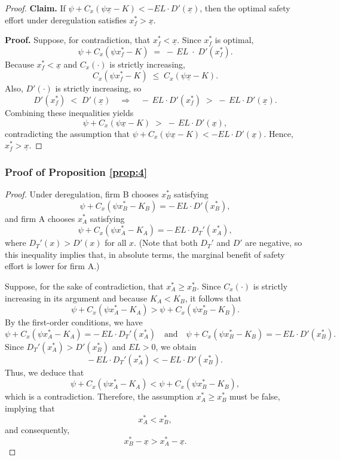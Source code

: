 \documentclass[letterpaper,12pt]{article}
\theoremstyle{definition}
\begin{document}
\begin{proof}
\textbf{Claim.} If \(\psi + C_x(\psi \underline{x} - K) < -EL \cdot D'(\underline{x})\), then the optimal safety effort under deregulation satisfies \(x_f^* > \underline{x}\).

\noindent\textbf{Proof.}
Suppose, for contradiction, that \(x_f^* < \underline{x}\). Since \(x_f^*\) is optimal,
\begin{equation}
    \psi + C_x(\psi x_f^* - K) \;=\; -\, EL \;\cdot\; D'(x_f^*).
\end{equation}
Because \(x_f^* < \underline{x}\) and \(C_x(\cdot)\) is strictly increasing, 
\[
    C_x(\psi x_f^* - K) \;\le\; C_x(\psi \underline{x} - K).
\]
Also, \(D'(\cdot)\) is strictly increasing, so
\[
    D'(x_f^*) \;<\; D'(\underline{x})
    \quad\Longrightarrow\quad
    -\,EL \cdot D'(x_f^*) \;>\; -\,EL \cdot D'(\underline{x}).
\]
Combining these inequalities yields
\begin{equation}
    \psi + C_x(\psi \underline{x} - K)
    \;>\;
    -\,EL \cdot D'(\underline{x}),
\end{equation}
contradicting the assumption that \(\psi + C_x(\psi \underline{x} - K) < -EL \cdot D'(\underline{x})\). Hence, \(x_f^* > \underline{x}\).
\end{proof}

\subsubsection*{Proof of Proposition \ref{prop:4}}

\begin{proof}
Under deregulation, firm B chooses \(x_B^*\) satisfying
\[
\psi + C_x(\psi x_B^* - K_B) = -\,EL \cdot D'(x_B^*),
\]
and firm A chooses \(x_A^*\) satisfying
\[
\psi + C_x(\psi x_A^* - K_A) = -\,EL \cdot D_T'(x_A^*),
\]
where \(D_T'(x) > D'(x)\) for all \(x\). (Note that both \(D_T'\) and \(D'\) are negative, so this inequality implies that, in absolute terms, the marginal benefit of safety effort is lower for firm A.)

Suppose, for the sake of contradiction, that \(x_A^* \ge x_B^*\). Since \(C_x(\cdot)\) is strictly increasing in its argument and because \(K_A < K_B\), it follows that
\[
\psi + C_x(\psi x_A^* - K_A) > \psi + C_x(\psi x_B^* - K_B).
\]
By the first-order conditions, we have
\[
\psi + C_x(\psi x_A^* - K_A) = -\,EL \cdot D_T'(x_A^*) \quad \text{and} \quad \psi + C_x(\psi x_B^* - K_B) = -\,EL \cdot D'(x_B^*).
\]
Since \(D_T'(x_A^*) > D'(x_B^*)\) and \(EL > 0\), we obtain
\[
-\,EL \cdot D_T'(x_A^*) < -\,EL \cdot D'(x_B^*).
\]
Thus, we deduce that
\[
\psi + C_x(\psi x_A^* - K_A) < \psi + C_x(\psi x_B^* - K_B),
\]
which is a contradiction. Therefore, the assumption \(x_A^* \ge x_B^*\) must be false, implying that
\[
x_A^* < x_B^*,
\]
and consequently,
\[
x_B^* - \underline{x} > x_A^* - \underline{x}.
\]
\end{proof}
\end{document}
